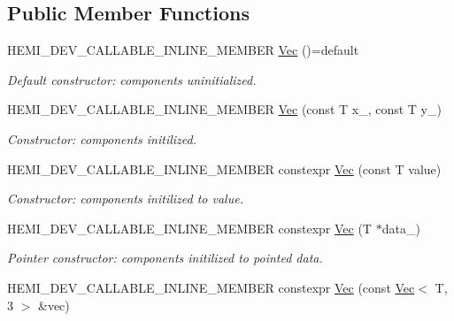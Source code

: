 \subsection*{Public Member Functions}
\begin{DoxyCompactItemize}
\item 
\hypertarget{structVec_3_01T_00_012_01_4_ab58ad2db4af2f4ee5ba01094d79b6c62}{}H\+E\+M\+I\+\_\+\+D\+E\+V\+\_\+\+C\+A\+L\+L\+A\+B\+L\+E\+\_\+\+I\+N\+L\+I\+N\+E\+\_\+\+M\+E\+M\+B\+E\+R \hyperlink{structVec_3_01T_00_012_01_4_ab58ad2db4af2f4ee5ba01094d79b6c62}{Vec} ()=default\label{structVec_3_01T_00_012_01_4_ab58ad2db4af2f4ee5ba01094d79b6c62}

\begin{DoxyCompactList}\small\item\em Default constructor\+: components uninitialized. \end{DoxyCompactList}\item 
H\+E\+M\+I\+\_\+\+D\+E\+V\+\_\+\+C\+A\+L\+L\+A\+B\+L\+E\+\_\+\+I\+N\+L\+I\+N\+E\+\_\+\+M\+E\+M\+B\+E\+R \hyperlink{structVec_3_01T_00_012_01_4_ad8e0567970b5b4f69803936d91abc4fe}{Vec} (const T x\+\_\+, const T y\+\_\+)
\begin{DoxyCompactList}\small\item\em Constructor\+: components initilized. \end{DoxyCompactList}\item 
H\+E\+M\+I\+\_\+\+D\+E\+V\+\_\+\+C\+A\+L\+L\+A\+B\+L\+E\+\_\+\+I\+N\+L\+I\+N\+E\+\_\+\+M\+E\+M\+B\+E\+R constexpr \hyperlink{structVec_3_01T_00_012_01_4_a7bd8c58dab2f762360a6061ea4dc6d5f}{Vec} (const T value)
\begin{DoxyCompactList}\small\item\em Constructor\+: components initilized to value. \end{DoxyCompactList}\item 
H\+E\+M\+I\+\_\+\+D\+E\+V\+\_\+\+C\+A\+L\+L\+A\+B\+L\+E\+\_\+\+I\+N\+L\+I\+N\+E\+\_\+\+M\+E\+M\+B\+E\+R constexpr \hyperlink{structVec_3_01T_00_012_01_4_a5091db99b110a4339666121d2714a637}{Vec} (T $\ast$data\+\_\+)
\begin{DoxyCompactList}\small\item\em Pointer constructor\+: components initilized to pointed data. \end{DoxyCompactList}\item 
H\+E\+M\+I\+\_\+\+D\+E\+V\+\_\+\+C\+A\+L\+L\+A\+B\+L\+E\+\_\+\+I\+N\+L\+I\+N\+E\+\_\+\+M\+E\+M\+B\+E\+R constexpr \hyperlink{structVec_3_01T_00_012_01_4_a4e8bf5c102a63649a9728423520b2e7b}{Vec} (const \hyperlink{structVec}{Vec}$<$ T, 3 $>$ \&vec)

\end{DoxyCompactItemize}
